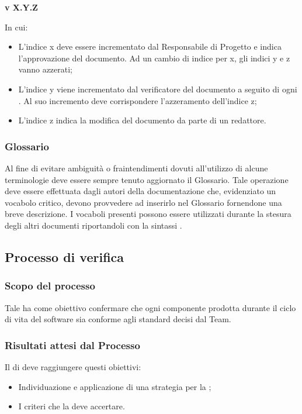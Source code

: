 \begin{center}
  \textbf{v X.Y.Z}
\end{center}

In cui:
\begin{itemize}
\item L'indice x deve essere incrementato dal Responsabile di Progetto e indica l'approvazione del documento. Ad un cambio di indice per x, gli indici y e z vanno azzerati;
\item L'indice y viene incrementato dal verificatore del documento a seguito di ogni . Al suo incremento deve corrispondere l'azzeramento dell'indice z;
\item L'indice z indica la modifica del documento da parte di un redattore.
\end{itemize}

\subsubsection{Glossario}
Al fine di evitare ambiguità o fraintendimenti dovuti all'utilizzo di alcune terminologie deve essere sempre tenuto aggiornato il Glossario. Tale operazione deve essere effettuata dagli autori della documentazione che, evidenziato un vocabolo critico, devono provvedere ad inserirlo nel Glossario fornendone una breve descrizione. I vocaboli presenti possono essere utilizzati durante la stesura degli altri documenti riportandoli con la sintassi .

\subsection{Processo di verifica}
\subsubsection{Scopo del processo}
Tale  ha come obiettivo confermare che ogni componente prodotta durante il ciclo di vita del software sia conforme agli standard decisi dal Team.
\subsubsection{Risultati attesi dal Processo}
Il  di  deve raggiungere questi obiettivi:
\begin{itemize}
\item Individuazione e applicazione di una strategia per la ;
\item I criteri che la  deve accertare.
\end{itemize}

